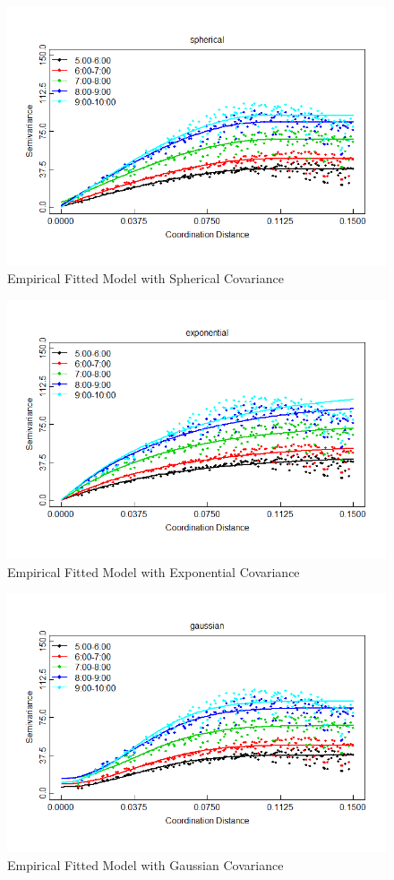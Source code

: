 \documentclass[hidelinks,12pt]{article}
\begin{document}
	\begin{figure}[!ht]
		\includegraphics[width=\textwidth]{semfit_spherical.png}
		\caption{Empirical Fitted Model with Spherical Covariance \label{fig:semsph}}
	\end{figure}
	\begin{figure}[!ht]
		\includegraphics[width=\textwidth]{semfit_exponential.png}
		\caption{Empirical Fitted Model with Exponential Covariance \label{fig:semexp}}
	\end{figure}
	\begin{figure}[!ht]
		\includegraphics[width=\textwidth]{semfit_gaussian.png}
		\caption{Empirical Fitted Model with Gaussian Covariance \label{fig:semgau}}
	\end{figure}
\end{document}
